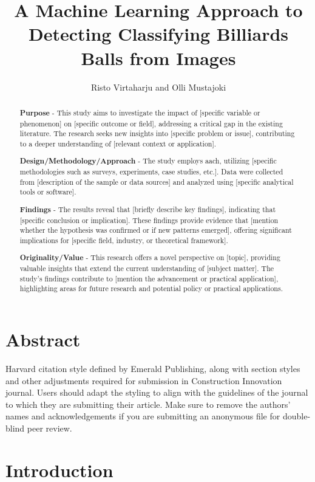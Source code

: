 \documentclass{article}
\author{Risto Virtaharju and Olli Mustajoki}
\begin{document}

\title{A Machine Learning Approach to Detecting Classifying Billiards Balls from Images}
\maketitle


\begin{abstract}
\textbf{Purpose} - This study aims to investigate the impact of [specific variable or phenomenon] on [specific outcome or field], addressing a critical gap in the existing literature. The research seeks new insights into [specific problem or issue], contributing to a deeper understanding of [relevant context or application].

\textbf{Design/Methodology/Approach} - The study employs aach, utilizing [specific methodologies such as surveys, experiments, case studies, etc.]. Data were collected from [description of the sample or data sources] and analyzed using [specific analytical tools or software].

\textbf{Findings} - The results reveal that [briefly describe key findings], indicating that [specific conclusion or implication]. These findings provide evidence that [mention whether the hypothesis was confirmed or if new patterns emerged], offering significant implications for [specific field, industry, or theoretical framework].

\textbf{Originality/Value} - This research offers a novel perspective on [topic], providing valuable insights that extend the current understanding of [subject matter]. The study’s findings contribute to [mention the advancement or practical application], highlighting areas for future research and potential policy or practical applications. 

\end{abstract}

\section*{Abstract}
Harvard citation style defined by Emerald Publishing, along with section styles and other adjustments required for submission in Construction Innovation journal.
Users should adapt the styling to align with the guidelines of the journal to which they are submitting their article. Make sure to remove the authors' names and acknowledgements if you are submitting an anonymous file for double-blind peer review.

\section{Introduction}
\label{sec:introduction}
\end{document}

